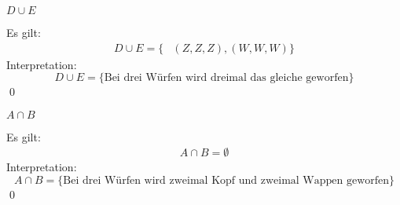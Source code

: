 \documentclass{abgabe}
\begin{document}
\begin{questions}
\begin{parts}
\begin{subparts}
            \newpage
            \subpart
            $D \cup E$
            \begin{solution}
                Es gilt:
                \[
                    \begin{aligned}
                        D \cup E =
                        \{
                         & (Z,Z,Z), (W,W,W)
                        \}
                    \end{aligned}
                \]
                Interpretation:
                \[
                    D \cup E = \{ \text{Bei drei Würfen wird dreimal das gleiche geworfen} \}
                \]
                \qed
            \end{solution}

            \subpart
            $A \cap B$
            \begin{solution}
                Es gilt:
                \[
                    \begin{aligned}
                        A \cap B =
                        \emptyset
                    \end{aligned}
                \]
                Interpretation:
                \[
                    A \cap B = \{ \text{Bei drei Würfen wird zweimal Kopf und zweimal Wappen geworfen} \}
                \]
                \qed
            \end{solution}
        \end{subparts}
    \end{parts}
\end{questions}
\end{document}
